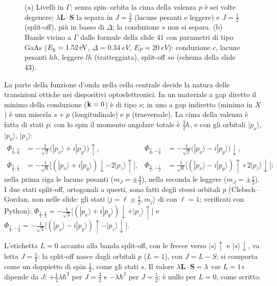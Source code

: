 \documentclass[11pt,a4paper]{article}
\begin{document}
\begin{figure}[tbp]
\centering
{}
\caption{(a) Livelli in $\Gamma$: senza spin--orbita la cima della valenza $p$ è sei volte degenere; $\lambda\mathbf L\cdot\mathbf S$ la separa in $J=\frac32$
(lacune pesanti e leggere) e $J=\frac12$ (split-off), più in basso di $\Delta$; la conduzione $s$ non si separa. (b) Bande vicino a $\Gamma$ dalle formule
della slide 41 con parametri di tipo GaAs ($E_{\mathrm g}=\SI{1.52}{eV}$, $\Delta=\SI{0.34}{eV}$, $E_P=\SI{20}{eV}$): conduzione $c$, lacune pesanti $hh$,
leggere $lh$ (tratteggiata), split-off $so$ (schema della slide 43).}\label{fig:kp}
\end{figure}

La parte della funzione d'onda nella cella centrale decide la natura delle transizioni ottiche nei dispositivi optoelettronici. In un materiale a gap
diretto il minimo della conduzione ($\mathbf k=0$) è di tipo $s$; in uno a gap indiretto (minimo in $X$) è una miscela $s+p$ (longitudinale) e $p$
(trasversale). La cima della valenza è fatta di stati $p$: con lo spin il momento angolare totale è $\frac32\hbar$, e con gli orbitali $|p_x\rangle$,
$|p_y\rangle$, $|p_z\rangle$:
\begin{align*}
\Phi_{\frac32,\frac32}&=-\tfrac1{\sqrt2}\bigl(|p_x\rangle+i|p_y\rangle\bigr){\uparrow}, &
\Phi_{\frac32,-\frac32}&=-\tfrac1{\sqrt2}\bigl(|p_x\rangle-i|p_y\rangle\bigr){\downarrow},\\
\Phi_{\frac32,\frac12}&=-\tfrac1{\sqrt6}\bigl[(|p_x\rangle+i|p_y\rangle){\downarrow}-2|p_z\rangle{\uparrow}\bigr], &
\Phi_{\frac32,-\frac12}&=\tfrac1{\sqrt6}\bigl[(|p_x\rangle-i|p_y\rangle){\uparrow}+2|p_z\rangle{\downarrow}\bigr]:
\end{align*}
nella prima riga le lacune pesanti ($m_J=\pm\frac32$), nella seconda le leggere ($m_J=\pm\frac12$).
I due stati split-off, ortogonali a questi, sono fatti degli stessi orbitali $p$ (Clebsch--Gordan, non nelle slide: gli stati $|j=\ell\pm\frac12,m_j\rangle$
di  con $\ell=1$; verificati con Python):
$\Phi_{\frac12,\frac12}=-\frac1{\sqrt3}\bigl[(|p_x\rangle+i|p_y\rangle){\downarrow}+|p_z\rangle{\uparrow}\bigr]$ e
$\Phi_{\frac12,-\frac12}=-\frac1{\sqrt3}\bigl[(|p_x\rangle-i|p_y\rangle){\uparrow}-|p_z\rangle{\downarrow}\bigr]$.

\begin{osservazione}[slide 44]
L'etichetta $L=0$ accanto alla banda split-off, con le frecce verso $|s\rangle{\uparrow}$ e $|s\rangle{\downarrow}$, va letta $J=\frac12$: la split-off
nasce dagli orbitali $p$ ($L=1$), con $J=L-S$; si comporta come un doppietto di spin $\frac12$, come gli stati $s$. Il valore
$\lambda\mathbf L\cdot\mathbf S=\lambda$ «se $L=1$» dipende da $J$: $+\frac12\lambda\hbar^2$ per $J=\frac32$ e $-\lambda\hbar^2$ per $J=\frac12$; è nullo
per $L=0$, come scritto.
\end{osservazione}
\end{document}
